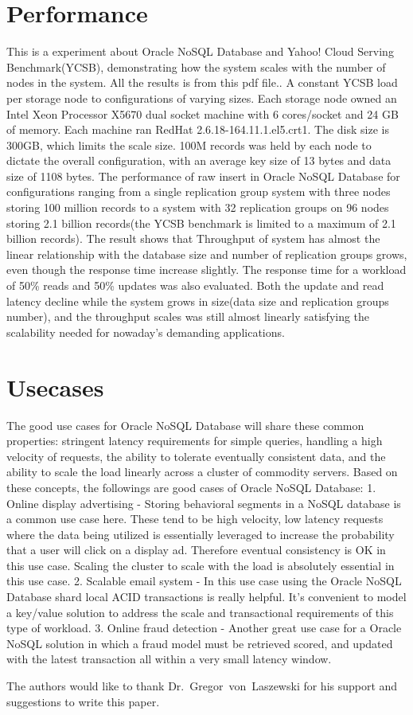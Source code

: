 \section{Performance}
This is a experiment about Oracle NoSQL Database and Yahoo! Cloud Serving Benchmark(YCSB), demonstrating how the system scales with the number of nodes in the system. All the results is from this pdf file.\cite{hid-sp18-515-editor02}.
A constant YCSB load per storage node to configurations of varying sizes. Each storage node owned an Intel Xeon Processor X5670 dual socket machine with 6 cores/socket and 24 GB of memory. Each machine ran RedHat 2.6.18-164.11.1.el5.crt1. The disk size is 300GB, which limits the scale size. 100M records was held by each node to dictate the overall configuration, with an average key size of 13 bytes and data size of 1108 bytes. 
The performance of raw insert in Oracle NoSQL Database for configurations ranging from a single replication group system with three nodes storing 100 million records to a system with 32 replication groups on 96 nodes storing 2.1 billion records(the YCSB benchmark is limited to a maximum of 2.1 billion records). The result shows that Throughput of system has almost the linear relationship with the database size and number of replication groups grows, even though the response time increase slightly. The response time for a workload of 50\% reads and 50\% updates was also evaluated. Both the update and read latency decline while the system grows in size(data size and replication groups number), and the throughput scales was still almost linearly satisfying the scalability needed for nowaday's demanding applications. 

\section{Usecases}
The good use cases for Oracle NoSQL Database will share these common properties: stringent latency requirements for simple queries, handling a high velocity of requests, the ability to tolerate eventually consistent data, and the ability to scale the load linearly across a cluster of commodity servers. Based on these concepts, the followings are good cases of Oracle NoSQL Database:
1. Online display advertising - Storing behavioral segments in a NoSQL database is a common use case here.  These tend to be high velocity, low latency requests where the data being utilized is essentially leveraged to increase the probability that a user will click on a display ad.  Therefore eventual consistency is OK in this use case.  Scaling the cluster to scale with the load is absolutely essential in this use case.
2.  Scalable email system - In this use case using the Oracle NoSQL Database shard local ACID transactions is really helpful.  It's convenient to model a key/value solution to address the scale and transactional requirements of this type of workload.  
3.  Online fraud detection - Another great use case for a Oracle NoSQL solution in which a fraud model must be retrieved  scored, and updated with the latest transaction  all within a very small latency window.

\begin{acks}

  The authors would like to thank Dr.~Gregor~von~Laszewski for his
  support and suggestions to write this paper.

\end{acks}


 

